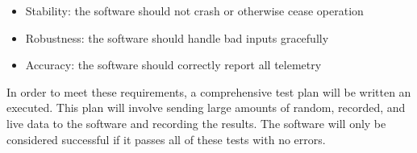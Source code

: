\documentclass[10pt,journal,draftclsnofoot,onecolumn]{IEEEtran}
\begin{document}
\begin{itemize}
\item Stability: the software should not crash or otherwise cease operation
\item Robustness: the software should handle bad inputs gracefully
\item Accuracy: the software should correctly report all telemetry
\end{itemize}

In order to meet these requirements, a comprehensive test plan will
be written an executed. This plan will involve sending large amounts
of random, recorded, and live data to the software and recording the results.
The software will only be considered successful if it passes all of these
tests with no errors.
\end{document}

